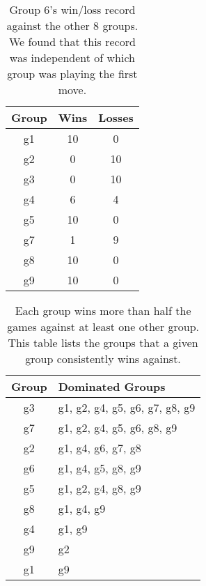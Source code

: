 \documentclass{scrartcl}
\begin{document}
\begin{table}[h]
\centering
\caption{Group 6's win/loss record against the other 8 groups. We found that this record was independent of which group was playing the first move.}
\begin{tabular}{|c|c|c|}\hline
Group & Wins & Losses \\ \hline
g1 & 10 & 0 \\ \hline
g2 & 0 & 10 \\ \hline
g3 & 0 & 10 \\ \hline
g4 & 6 & 4 \\ \hline
g5 & 10 & 0 \\ \hline
g7 & 1 & 9 \\ \hline
g8 & 10 & 0 \\ \hline
g9 & 10 & 0 \\ \hline
\end{tabular}
\label{tab:tournament1}
\end{table}

\begin{table}[h]
\centering
\caption{Each group wins more than half the games against at least one other group. This table lists the groups that a given group consistently wins against.}
\begin{tabular}{|c|l|}\hline
Group & Dominated Groups \\ \hline
g3 & g1, g2, g4, g5, g6, g7, g8, g9 \\ \hline
g7 & g1, g2, g4, g5, g6, g8, g9 \\ \hline
g2 & g1, g4, g6, g7, g8 \\ \hline
g6 & g1, g4, g5, g8, g9 \\ \hline
g5 & g1, g2, g4, g8, g9 \\ \hline
g8 & g1, g4, g9 \\ \hline
g4 & g1, g9 \\ \hline
g9 & g2 \\ \hline
g1 & g9 \\ \hline
\end{tabular}
\label{tab:tournament2}
\end{table}
\end{document}
